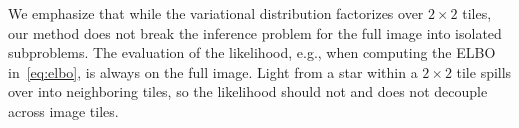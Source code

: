 We emphasize that while the variational distribution factorizes over $2 \times 2$ tiles, our method does not break the inference problem for the full image into isolated subproblems. The evaluation of the likelihood, e.g., when computing the ELBO in~\eqref{eq:elbo}, is always on the full image. Light from a star within a $2 \times 2$ tile spills over into neighboring tiles, so the likelihood should not and does not decouple across image tiles. 
